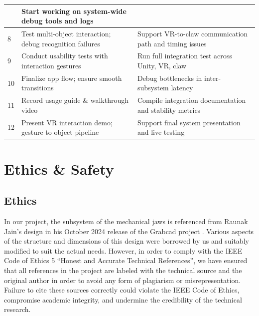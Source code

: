 \documentclass{senior-design}
\begin{document}
\begin{longtable}{|p{}|p{}|p{}|}
&Start working on system-wide debug tools and logs 
\\
\hline
8 

&Test multi-object interaction; debug recognition failures 

&Support VR-to-claw communication path and timing issues 
\\
\hline
9 

&Conduct usability tests with interaction gestures 

&Run full integration test across Unity, VR, claw 
\\
\hline
10 


&Finalize app flow; ensure smooth transitions 

&Debug bottlenecks in inter-subsystem latency 
\\
\hline
11 

&Record usage guide \& walkthrough video 

&Compile integration documentation and stability metrics 
\\
\hline
12 

&Present VR interaction demo; gesture to object pipeline 

&Support final system presentation and live testing 
\\
\hline
\end{longtable}
\chapter{Ethics \& Safety}
\section{Ethics} 
In our project, the subsystem of the mechanical jaws is referenced from Raunak Jain's design in his October 2024 release of the Grabcad project \cite{Jain2024}. Various aspects of the structure and dimensions of this design were borrowed by us and suitably modified to suit the actual needs. However, in order to comply with the IEEE Code of Ethics 5 “Honest and Accurate Technical References”, we have ensured that all references in the project are labeled with the technical source and the original author in order to avoid any form of plagiarism or misrepresentation. Failure to cite these sources correctly could violate the IEEE Code of Ethics, compromise academic integrity, and undermine the credibility of the technical research. 
 
\end{document}
